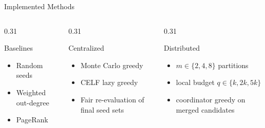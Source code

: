 \documentclass[10pt, aspectratio=169]{beamer}
\begin{document}
\begin{frame}{Implemented Methods}
    \begin{columns}[T,onlytextwidth]
        \begin{column}{0.31\linewidth}
            \begin{block}{Baselines}
                \begin{itemize}
                    \item Random seeds
                    \item Weighted out-degree
                    \item PageRank
                \end{itemize}
            \end{block}
        \end{column}
        \begin{column}{0.31\linewidth}
            \begin{block}{Centralized}
                \begin{itemize}
                    \item Monte Carlo greedy
                    \item CELF lazy greedy
                    \item Fair re-evaluation of final seed sets
                \end{itemize}
            \end{block}
        \end{column}
        \begin{column}{0.31\linewidth}
            \begin{block}{Distributed}
                \begin{itemize}
                    \item $m\in\{2,4,8\}$ partitions
                    \item local budget $q\in\{k,2k,5k\}$
                    \item coordinator greedy on merged candidates
                \end{itemize}
            \end{block}
        \end{column}
    \end{columns}
\end{frame}
\end{document}
